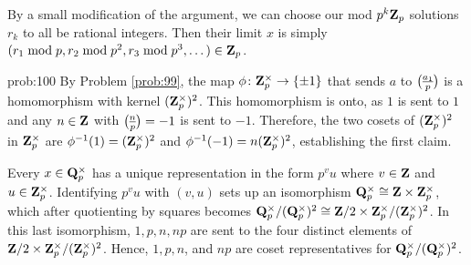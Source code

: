 \begin{rmk} By a small modification of the argument, we can choose our mod $p^k\mathbf{Z}_p$ solutions $r_k$ to all be rational integers. Then their limit $x$ is simply $(r_1\bmod{p}, r_2\bmod{p^2}, r_3\bmod{p^3},\dots) \in \mathbf{Z}_p$.
\end{rmk}

\begin{sol}{prob:100} By Problem \ref{prob:99}, the map $\phi\colon\mathbf{Z}_p^{\times} \to \{\pm 1\}$ that sends $a$ to $\legendre{a_1}{p}$ is a homomorphism with kernel $(\mathbf{Z}_p^{\times})^2$. This homomorphism is onto, as $1$ is sent to $1$ and any $n\in \mathbf{Z}$ with $\legendre{n}{p}=-1$ is sent to $-1$. Therefore, the two cosets of $(\mathbf{Z}_p^{\times})^2$ in $\mathbf{Z}_p^{\times}$ are $\phi^{-1}(1) = (\mathbf{Z}_p^{\times})^2$ and $\phi^{-1}(-1) = n(\mathbf{Z}_p^{\times})^2$, establishing the first claim.  

Every $x \in \mathbf{Q}_p^{\times}$ has a unique representation in the form $p^v u$ where $v \in \mathbf{Z}$ and $u \in \mathbf{Z}_p^{\times}$. Identifying $p^v u$ with $(v,u)$ sets up an isomorphism $\mathbf{Q}_p^{\times} \cong \mathbf{Z}\times \mathbf{Z}_p^{\times}$, which after quotienting by squares becomes $\mathbf{Q}_p^{\times}/(\mathbf{Q}_p^{\times})^2 \cong \mathbf{Z}/2 \times \mathbf{Z}_p^{\times}/(\mathbf{Z}_p^{\times})^2$. In this last isomorphism, $1, p, n, np$ are sent to the four distinct elements of $\mathbf{Z}/2 \times \mathbf{Z}_p^{\times}/(\mathbf{Z}_p^{\times})^2$. Hence, $1, p, n$, and $np$ are coset representatives for $\mathbf{Q}_p^{\times}/(\mathbf{Q}_p^{\times})^2$.
\end{sol}

